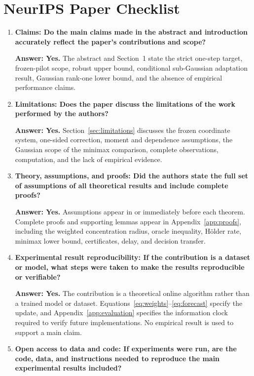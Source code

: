 \section*{NeurIPS Paper Checklist}

\begin{enumerate}

\item \textbf{Claims: Do the main claims made in the abstract and introduction accurately reflect the paper's contributions and scope?}

\textbf{Answer: Yes.} The abstract and Section~1 state the strict one-step target, frozen-pilot scope, robust upper bound, conditional sub-Gaussian adaptation result, Gaussian rank-one lower bound, and the absence of empirical performance claims.

\item \textbf{Limitations: Does the paper discuss the limitations of the work performed by the authors?}

\textbf{Answer: Yes.} Section~\ref{sec:limitations} discusses the frozen coordinate system, one-sided correction, moment and dependence assumptions, the Gaussian scope of the minimax comparison, complete observations, computation, and the lack of empirical evidence.

\item \textbf{Theory, assumptions, and proofs: Did the authors state the full set of assumptions of all theoretical results and include complete proofs?}

\textbf{Answer: Yes.} Assumptions appear in or immediately before each theorem. Complete proofs and supporting lemmas appear in Appendix~\ref{app:proofs}, including the weighted concentration radius, oracle inequality, H\"older rate, minimax lower bound, certificates, delay, and decision transfer.

\item \textbf{Experimental result reproducibility: If the contribution is a dataset or model, what steps were taken to make the results reproducible or verifiable?}

\textbf{Answer: Yes.} The contribution is a theoretical online algorithm rather than a trained model or dataset. Equations~\eqref{eq:weights}--\eqref{eq:forecast} specify the update, and Appendix~\ref{app:evaluation} specifies the information clock required to verify future implementations. No empirical result is used to support a main claim.

\item \textbf{Open access to data and code: If experiments were run, are the code, data, and instructions needed to reproduce the main experimental results included?}


\end{enumerate}
